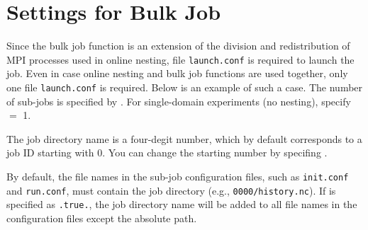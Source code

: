 \section{Settings for Bulk Job}
Since the bulk job function is an extension of the division and redistribution of MPI processes used in online nesting, file \verb|launch.conf| is required to launch the job. Even in case online nesting and bulk job functions are used together, only one file \verb|launch.conf| is required.
Below is an example of such a case.
The number of sub-jobs is specified by .
For single-domain experiments (no nesting), specify  $=$ 1.

The job directory name is a four-degit number, which by default corresponds to a job ID starting with 0.
You can change the starting number by specifing .

By default, the file names in the sub-job configuration files, such as \verb|init.conf| and \verb|run.conf|, must contain the job directory (e.g., \verb|0000/history.nc|).
If  is specified as \verb|.true.|, the job directory name will be added to all file names in the configuration files except the absolute path.

